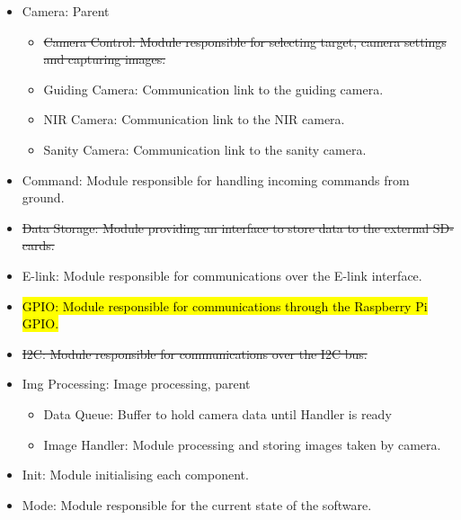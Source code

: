 \begin{itemize}

	\item Camera: Parent
		\begin{itemize}
			\item \st{Camera Control: Module responsible for selecting target, camera settings and capturing images.}
			\item Guiding Camera: Communication link to the guiding camera.
			\item NIR Camera: Communication link to the NIR camera.
			\item Sanity Camera: Communication link to the sanity camera.
		\end{itemize}

	\item Command: Module responsible for handling incoming commands from ground.

	\item \st{Data Storage: Module providing an interface to store data to the external SD-cards.}

	\item E-link: Module responsible for communications over the E-link interface.

    \item \hl{GPIO: Module responsible for communications through the Raspberry Pi GPIO.}

	\item \st{I2C: Module responsible for communications over the I2C bus.}

	\item Img Processing: Image processing, parent
		\begin{itemize}
			\item Data Queue: Buffer to hold camera data until Handler is ready
			\item Image Handler: Module processing and storing images taken by camera.
		\end{itemize}

	\item Init: Module initialising each component.

	\item Mode: Module responsible for the current state of the software.


\end{itemize}
